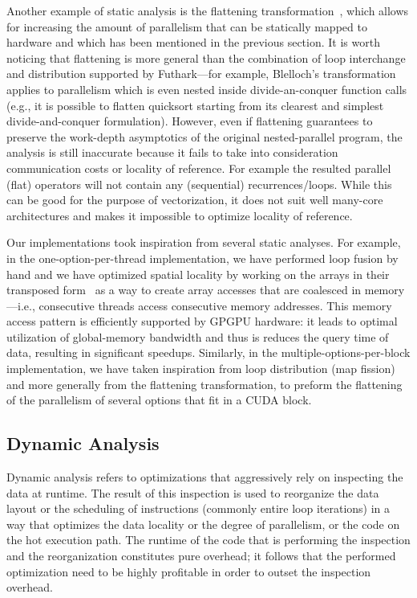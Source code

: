 Another example of static analysis is the flattening transformation~\cite{blelloch1994implementation}, which allows for increasing the amount of parallelism that can be statically mapped to hardware and which has been mentioned in the previous section. It is worth noticing that flattening is more general than the combination of loop interchange and distribution supported by Futhark---for example, Blelloch's transformation applies to parallelism which is even nested inside divide-an-conquer function calls (e.g., it is possible to flatten quicksort starting from its clearest and simplest divide-and-conquer formulation).  However, even if flattening guarantees to preserve the work-depth asymptotics of the original nested-parallel program, the analysis is still inaccurate because it fails to take into consideration communication costs or locality of reference. For example the resulted parallel (flat) operators will not contain any (sequential) recurrences/loops. While this can be good for the purpose of vectorization, it does not suit well many-core architectures and makes it impossible to optimize locality of reference.

Our implementations took inspiration from several static analyses. For example, in the one-option-per-thread implementation, we have performed loop fusion by hand and we have optimized spatial locality by working on the arrays in their transposed form~\cite{LexiFiPricing} as a way to create array accesses that are coalesced in memory---i.e., consecutive threads access consecutive memory addresses. This memory access pattern is efficiently supported by GPGPU hardware: it leads to optimal utilization of global-memory bandwidth and thus is reduces the query time of data, resulting in significant speedups.   Similarly, in the multiple-options-per-block implementation, we have taken inspiration from loop distribution (map fission) and more generally from the flattening transformation, to preform the flattening of the parallelism of several options that fit in a CUDA block. 

\subsection{Dynamic Analysis}
\label{relwork-dyn}

Dynamic analysis refers to optimizations that aggressively rely on inspecting the data at runtime. The result of this inspection is used to reorganize the data layout or the scheduling of instructions (commonly entire loop iterations) in a way that optimizes the data locality or the degree of parallelism, or the code on the hot execution path.  The runtime of the code that is performing the inspection and the reorganization constitutes pure overhead; it follows that the performed optimization need to be highly profitable in order to outset the inspection overhead. 

